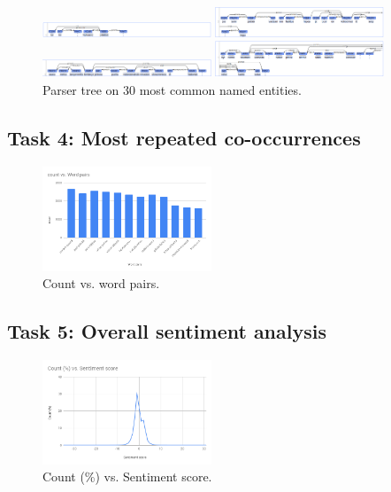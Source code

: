 \documentclass[conference]{IEEEtran}
\begin{document}
\begin{figure}[htbp]
    \centerline{\includegraphics[width=0.45\textwidth]{figures/fig5.png}}
    \centerline{\includegraphics[width=0.45\textwidth]{figures/fig7.png}}
    \centerline{\includegraphics[width=0.45\textwidth]{figures/fig8.png}}
    \centerline{\includegraphics[width=0.45\textwidth]{figures/fig9.png}}
    \caption{Parser tree on 30 most common named entities.}
    \label{parser_tree_on_30_most_common_named_entities}
\end{figure}
\clearpage

\subsection{Task 4: Most repeated co-occurrences}

\begin{figure}[hbtp]
    \centerline{\includegraphics[width=0.45\textwidth]{figures/fig12.png}}
    \caption{Count vs. word pairs.}
    \label{count_vs_word_pairs}
\end{figure}

\subsection{Task 5: Overall sentiment analysis}

\begin{figure}[htbp]
    \centerline{\includegraphics[width=0.45\textwidth]{figures/fig13.png}}
    \caption{Count (\%) vs. Sentiment score.}
    \label{count_percent_vs_sentiment_score}
\end{figure}
\end{document}

